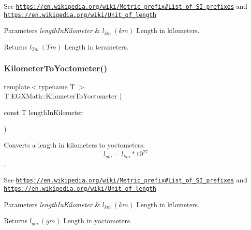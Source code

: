 See \href{https://en.wikipedia.org/wiki/Metric_prefix#List_of_SI_prefixes}{\tt https\+://en.\+wikipedia.\+org/wiki/\+Metric\+\_\+prefix\#\+List\+\_\+of\+\_\+\+S\+I\+\_\+prefixes} and \href{https://en.wikipedia.org/wiki/Unit_of_length}{\tt https\+://en.\+wikipedia.\+org/wiki/\+Unit\+\_\+of\+\_\+length} 
\begin{DoxyParams}{Parameters}
{\em length\+In\+Kilometer} & $ l_{km}\ (km)$ Length in kilometers. \\
\hline
\end{DoxyParams}
\begin{DoxyReturn}{Returns}
$ l_{Tm}\ (Tm)$ Length in terameters. 
\end{DoxyReturn}
\mbox{\label{group___e_g_x_math-_conversions-_length_conversions-_kilometer-_s_i_gaf03c100edda155de40290d8c3e155a27}} 
\subsubsection{\texorpdfstring{Kilometer\+To\+Yoctometer()}{KilometerToYoctometer()}}
{\footnotesize\ttfamily template$<$typename T $>$ \\
T E\+G\+X\+Math\+::\+Kilometer\+To\+Yoctometer (\begin{DoxyParamCaption}\item[{const T}]{length\+In\+Kilometer }\end{DoxyParamCaption})}



Converts a length in kilometers to yoctometers. \[ l_{ym}=l_{km} * 10^{27} \]. 

See \href{https://en.wikipedia.org/wiki/Metric_prefix#List_of_SI_prefixes}{\tt https\+://en.\+wikipedia.\+org/wiki/\+Metric\+\_\+prefix\#\+List\+\_\+of\+\_\+\+S\+I\+\_\+prefixes} and \href{https://en.wikipedia.org/wiki/Unit_of_length}{\tt https\+://en.\+wikipedia.\+org/wiki/\+Unit\+\_\+of\+\_\+length} 
\begin{DoxyParams}{Parameters}
{\em length\+In\+Kilometer} & $ l_{km}\ (km)$ Length in kilometers. \\
\hline
\end{DoxyParams}
\begin{DoxyReturn}{Returns}
$ l_{ym}\ (ym)$ Length in yoctometers. 
\end{DoxyReturn}
\mbox{\label{group___e_g_x_math-_conversions-_length_conversions-_kilometer-_s_i_gaf29070fac412b7a92466866b2ae32337}} 
